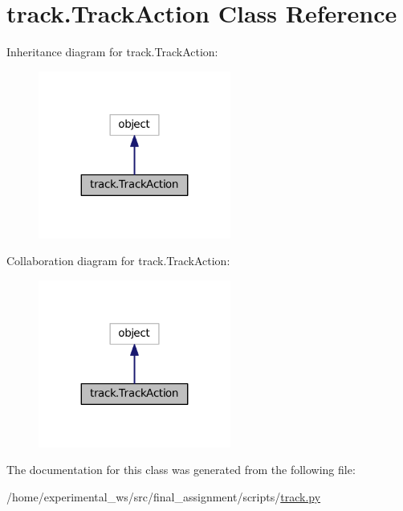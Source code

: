 \hypertarget{classtrack_1_1TrackAction}{}\section{track.\+Track\+Action Class Reference}
\label{classtrack_1_1TrackAction}


Inheritance diagram for track.\+Track\+Action\+:\nopagebreak
\begin{figure}[H]
\begin{center}
\leavevmode
\includegraphics[width=179pt]{classtrack_1_1TrackAction__inherit__graph}
\end{center}
\end{figure}


Collaboration diagram for track.\+Track\+Action\+:\nopagebreak
\begin{figure}[H]
\begin{center}
\leavevmode
\includegraphics[width=179pt]{classtrack_1_1TrackAction__coll__graph}
\end{center}
\end{figure}


The documentation for this class was generated from the following file\+:\begin{DoxyCompactItemize}
\item 
/home/experimental\+\_\+ws/src/final\+\_\+assignment/scripts/\hyperlink{track_8py}{track.\+py}\end{DoxyCompactItemize}
